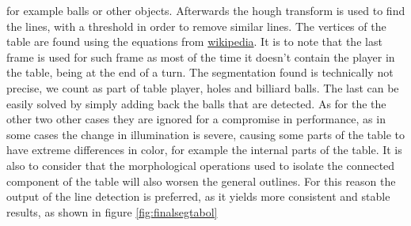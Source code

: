 for example balls or other objects. Afterwards the hough transform is used to find the lines, 
with a threshold in order to remove similar lines.
The vertices of the table are found using the equations from \href{https://en.wikipedia.org/wiki/Line\%E2\%80\%93line\_intersection}{wikipedia}.
It is to note that the last frame is used for such frame as most of the time it doesn't contain the player in the table, being at the end of
a turn.
The segmentation found is technically not precise, we count as part of table player, holes and billiard balls. The last can be easily solved by simply adding back the balls that are detected. 
As for the the other two other cases they are ignored for a compromise in performance, as in some
cases the change in illumination is severe, causing some parts of the table to have extreme 
differences in color, for example the internal parts of the table. It is also to consider that the morphological operations used to isolate the connected component of the table will also worsen
the general outlines. For this reason the output of the line detection is preferred, as it yields
more consistent and stable results, as shown in figure \ref{fig:finalsegtabol}

